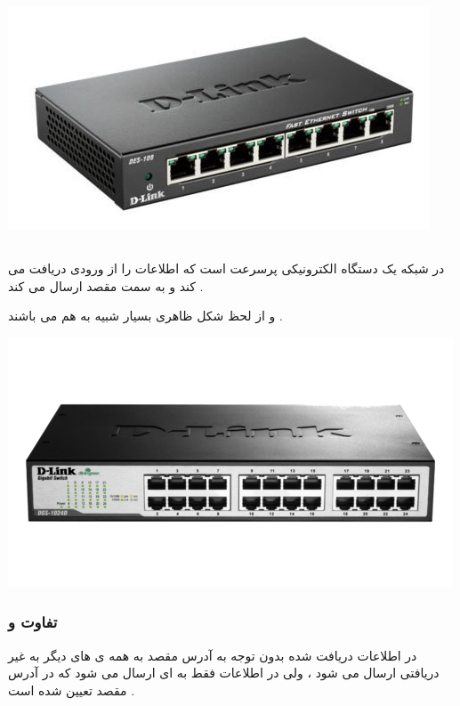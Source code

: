 \documentclass[12pt]{book}
\begin{document}
\begin{center}
	\includegraphics[scale=0.6]{./network-hubs-500x500.jpg}
\end{center}

\subsection{}

در شبکه یک دستگاه الکترونیکی پرسرعت است که اطلاعات را از ورودی دریافت می کند و به سمت مقصد ارسال می کند .

و
از لحظ شکل ظاهری بسیار شبیه به هم می باشند .

\begin{center}
	\includegraphics[scale=0.6]{./d-link-32-code-networking-switch-500x500.png}
\end{center}



\subsubsection{تفاوت
و
}

در 
اطلاعات دریافت شده بدون توجه به آدرس مقصد به همه ی 
های دیگر به غیر 
دریافتی ارسال می شود ،
ولی در 
اطلاعات فقط به 
ای ارسال می شود که در آدرس مقصد تعیین شده است .
\end{document}
